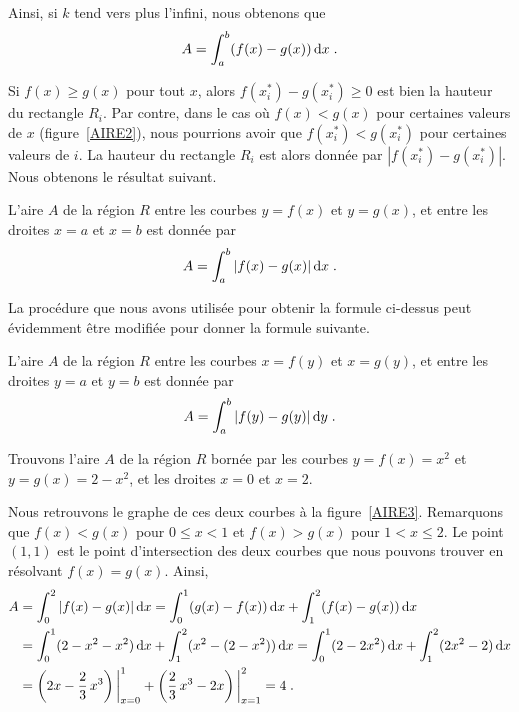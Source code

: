 {Ainsi, si $k$ tend vers plus l'infini, nous obtenons que
\[
A = \int_a^b (f(x)-g(x))\,\mathrm{d}x \; .
\]

Si $f(x) \geq g(x)$ pour tout $x$, alors
$f(x_i^\ast)-g(x_i^\ast) \geq 0$ est bien la hauteur du rectangle
$R_i$.  Par contre, dans le cas où $f(x) < g(x)$ pour certaines
valeurs de $x$ (figure~\ref{AIRE2}), nous pourrions avoir que
$f(x_i^\ast) < g(x_i^\ast)$ pour certaines valeurs de $i$.
La hauteur du rectangle $R_i$ est alors donnée par
$|f(x_i^\ast)-g(x_i^\ast)|$.  Nous obtenons le résultat suivant.


\begin{focus}{\mth}
L'aire $A$ de la région $R$ entre les courbes $y=f(x)$ et $y=g(x)$, et
entre les droites $x=a$ et $x=b$ est donnée par
\[
A = \int_a^b |f(x)-g(x)|\,\mathrm{d}x \; .
\]
\end{focus}

La procédure que nous avons utilisée pour obtenir la formule ci-dessus peut
évidemment être modifiée pour donner la formule suivante.

\begin{focus}{\mth}
L'aire $A$ de la région $R$ entre les courbes $x=f(y)$ et $x=g(y)$, et
entre les droites $y=a$ et $y=b$ est donnée par
\[
A = \int_a^b |f(y)-g(y)|\,\mathrm{d}y \; .
\]
\end{focus}

\begin{egg}
Trouvons l'aire $A$ de la région $R$ bornée par les courbes $y=f(x)=x^2$ et
$y=g(x)=2-x^2$, et les droites $x=0$ et $x=2$.

Nous retrouvons le graphe de ces deux courbes à la figure~\ref{AIRE3}.
Remarquons que $f(x)<g(x)$ pour $0\leq x < 1$ et $f(x)>g(x)$ pour $1<x\leq 2$.
Le point $(1,1)$ est le point d'intersection des deux courbes que nous
pouvons trouver en résolvant $f(x)=g(x)$.  Ainsi,
\begin{align*}
A &= \int_0^2 |f(x)-g(x)|\,\mathrm{d}x = \int_0^1 (g(x)-f(x))\,\mathrm{d}x
+ \int_1^2 (f(x)-g(x))\,\mathrm{d}x \\
&= \int_0^1 (2-x^2-x^2)\,\mathrm{d}x + \int_1^2(x^2-(2-x^2))\,\mathrm{d}x
= \int_0^1 (2-2x^2)\,\mathrm{d}x + \int_1^2(2x^2-2)\,\mathrm{d}x \\
&= \left( 2x-\frac{2}{3} \, x^3\right)\bigg|_{x=0}^1 +
\left( \frac{2}{3}\,x^3 - 2x \right)\bigg|_{x=1}^2 = 4 \; .
\end{align*}
\end{egg}

}
